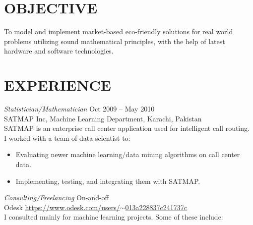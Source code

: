 \documentclass[margin, 10pt]{res} %
\begin{document}
\begin{resume}

 
\section{OBJECTIVE}  

To model and implement market-based eco-friendly solutions for real world problems utilizing sound mathematical principles, with the help of latest hardware and software technologies.


 
\section{EXPERIENCE}

{\sl Statistician/Mathematician} \hfill Oct 2009 -- May 2010 \\
SATMAP Inc, Machine Learning Department, Karachi, Pakistan  \\
SATMAP is an enterprise call center application used for intelligent call routing. I worked with a team of data scientist to:

\begin{itemize} \itemsep -2pt %
\item Evaluating newer machine learning/data mining algorithms on call center data. 
\item Implementing, testing, and integrating them with SATMAP. 
\end{itemize}
 
{\sl Consulting/Freelancing} \hfill On-and-off \\
Odesk \hfill \href{https://www.odesk.com/users/~013a228837c241737c}{https://www.odesk.com/users/$\sim$013a228837c241737c} \\
I consulted mainly for machine learning projects. Some of these include: 


\end{resume}
\end{document}
